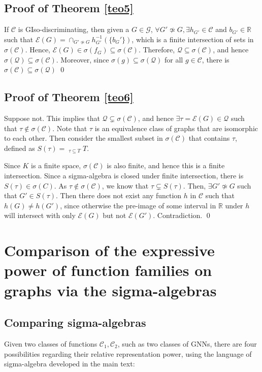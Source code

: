 \documentclass{article}
\def\Gfun{\mathcal{G}}
\def\Qfun{\mathcal{Q}}
\begin{document}
\subsection{Proof of Theorem \ref{teo5}}
If $\mathcal{C}$ is GIso-discriminating, then given a $G \in \Gfun$, $\forall G' \not \simeq G, \exists h_{G'} \in \mathcal{C}$ and $b_{G'} \in \mathbb{R}$ such that $\mathcal{E}(G) = \cap_{G' \not \simeq G} h_{G'}^{-1}(\{ b_G' \})$, which is a finite intersection  of sets in $\sigma(\mathcal{C})$. Hence, $\mathcal{E}(G) \in \sigma(f_G) \subseteq \sigma(\mathcal{C})$. Therefore, $\Qfun \subseteq \sigma(\mathcal{C})$, and hence $\sigma(\Qfun) \subseteq \sigma(\mathcal{C})$. Moreover, since $\sigma(g) \subseteq \sigma(\Qfun)$ for all $g \in \mathcal{C}$, there is $\sigma(\mathcal{C}) \subseteq \sigma(\Qfun)$
\qed

\subsection{Proof of Theorem \ref{teo6}}
Suppose not. This implies that $\Qfun \subsetneq \sigma(\mathcal{C})$, and hence $\exists \tau = \mathcal{E}(G) \in \Qfun$ such that $\tau \notin \sigma(\mathcal{C})$. Note that $\tau$ is an equivalence class of graphs that are isomorphic to each other. Then consider the smallest subset in $\sigma(\mathcal{C})$ that contains $\tau$, defined as $\displaystyle S(\tau) = \mathop{\bigcap_{T \in \sigma(\mathcal{C})}}_{\tau \subseteq T} T.$

Since $K$ is a finite space, $\sigma(\mathcal{C})$ is also finite, and hence this is a finite intersection. Since a sigma-algebra is closed under finite intersection, there is $S(\tau) \in \sigma(C)$. As $\tau \notin \sigma(\mathcal{C})$, we know that $\tau \subsetneq S(\tau)$. Then, $\exists G' \not\simeq G$ such that $G' \in S(\tau)$. Then there does not exist any function $h$ in $\mathcal{C}$ such that $h(G) \neq h(G')$, since otherwise the pre-image of some interval in $\mathbb{R}$ under $h$ will intersect with only $\mathcal{E}(G)$ but not $\mathcal{E}(G')$. Contradiction.
\qed



\section{Comparison of the expressive power of function families on graphs via the sigma-algebras} \label{app.comparison}
\subsection{Comparing sigma-algebras}
Given two classes of functions $\mathcal{C}_1, \mathcal{C}_2$, such as two classes of GNNs, there are four possibilities regarding their relative representation power, using the language of sigma-algebra developed in the main text:
\end{document}
